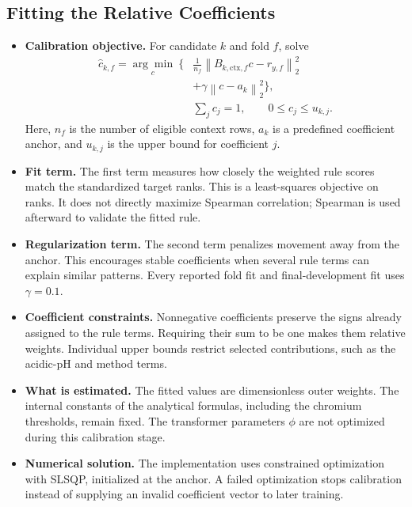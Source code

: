 \documentclass[11pt]{article}
\newenvironment{notes}
  {\begin{itemize}\setlength{\itemsep}{0.45em}\setlength{\parsep}{0pt}}
  {\end{itemize}}
\begin{document}
\subsection{Fitting the Relative Coefficients}
\label{sec:coefficient-objective}

\begin{notes}
    \item \textbf{Calibration objective.}
    For candidate \(k\) and fold \(f\), solve
    \begin{equation}
    \begin{aligned}
        \widehat c_{k,f}
        =\underset{c}{\arg\min}\ \bigg\{&
            \frac{1}{n_f}
            \left\|B_{k,\mathrm{ctx},f}c-r_{y,f}\right\|_2^2\\
            &+\gamma\left\|c-a_k\right\|_2^2
        \bigg\},\\
        &\sum_j c_j=1,\qquad 0\leq c_j\leq u_{k,j}.
    \end{aligned}
    \label{eq:rule-calibration}
    \end{equation}
    Here, \(n_f\) is the number of eligible context rows,
    \(a_k\) is a predefined coefficient anchor, and
    \(u_{k,j}\) is the upper bound for coefficient \(j\).

    \item \textbf{Fit term.}
    The first term measures how closely the weighted rule
    scores match the standardized target ranks.
    This is a least-squares objective on ranks.
    It does not directly maximize Spearman correlation;
    Spearman is used afterward to validate the fitted rule.

    \item \textbf{Regularization term.}
    The second term penalizes movement away from the anchor.
    This encourages stable coefficients when several rule
    terms can explain similar patterns.
    Every reported fold fit and final-development fit uses
    \(\gamma=0.1\).

    \item \textbf{Coefficient constraints.}
    Nonnegative coefficients preserve the signs already
    assigned to the rule terms. Requiring their sum to be one
    makes them relative weights. Individual upper bounds
    restrict selected contributions, such as the acidic-pH
    and method terms.

    \item \textbf{What is estimated.}
    The fitted values are dimensionless outer weights.
    The internal constants of the analytical formulas,
    including the chromium thresholds, remain fixed.
    The transformer parameters \(\phi\) are not optimized
    during this calibration stage.

    \item \textbf{Numerical solution.}
    The implementation uses constrained optimization with
    SLSQP, initialized at the anchor. A failed optimization
    stops calibration instead of supplying an invalid
    coefficient vector to later training.
\end{notes}
\end{document}
